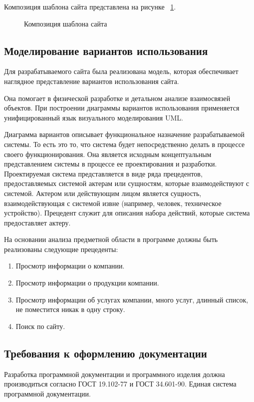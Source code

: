 Композиция шаблона сайта представлена на рисунке ~\ref{templ:image}.

\begin{figure}
\caption{Композиция шаблона сайта}
\label{templ:image}
\end{figure}
\vspace{-\figureaboveskip} %

\subsection{Моделирование вариантов использования}

Для разрабатываемого сайта была реализована модель, которая обеспечивает наглядное представление вариантов использования сайта.

Она помогает в физической разработке и детальном анализе взаимосвязей объектов. При построении диаграммы вариантов использования применяется унифицированный язык визуального моделирования UML.

Диаграмма вариантов описывает функциональное назначение разрабатываемой системы. То есть это то, что система будет непосредственно делать в процессе своего функционирования. Она является исходным концептуальным представлением системы в процессе ее проектирования и разработки. Проектируемая система представляется в виде ряда прецедентов, предоставляемых системой актерам или сущностям, которые взаимодействуют с системой. Актером или действующим лицом является сущность, взаимодействующая с системой извне (например, человек, техническое устройство). Прецедент служит для описания набора действий, которые система предоставляет актеру.

На основании анализа предметной области в программе должны быть реализованы следующие прецеденты:
\begin{enumerate}
\item Просмотр информации о компании.
\item Просмотр информации о продукции компании.
\item Просмотр информации об услугах компании, много услуг, длинный список, не поместится никак в одну строку.
\item Поиск по сайту.
\end{enumerate}

\subsection{Требования к оформлению документации}

Разработка программной документации и программного изделия должна производиться согласно ГОСТ 19.102-77 и ГОСТ 34.601-90. Единая система программной документации.
